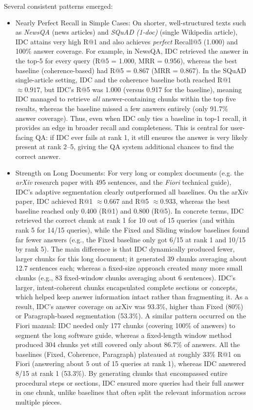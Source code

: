 \documentclass[12pt,a4paper]{report}
\begin{document}
Several consistent patterns emerged:

\begin{itemize}
\item Nearly Perfect Recall in Simple Cases: On shorter, well-structured texts such as \textit{NewsQA} (news articles) and \textit{SQuAD (1-doc)} (single Wikipedia article), IDC attains very high R@1 and also achieves \textit{perfect} Recall@5 (1.000) and 100\% answer coverage. For example, in NewsQA, IDC retrieved the answer in the top-5 for every query (R@5 = 1.000, MRR = 0.956), whereas the best baseline (coherence-based) had R@5 = 0.867 (MRR = 0.867). In the SQuAD single-article setting, IDC and the coherence baseline both reached R@1 $\approx 0.917$, but IDC's R@5 was 1.000 (versus 0.917 for the baseline), meaning IDC managed to retrieve \textit{all} answer-containing chunks within the top five results, whereas the baseline missed a few answers entirely (only 91.7\% answer coverage). Thus, even when IDC only ties a baseline in top-1 recall, it provides an edge in broader recall and completeness. This is central for user-facing QA: if IDC ever fails at rank 1, it still ensures the answer is very likely present at rank 2--5, giving the QA system additional chances to find the correct answer.

\item Strength on Long Documents: For very long or complex documents (e.g. the \textit{arXiv} research paper with 495 sentences, and the \textit{Fiori} technical guide), IDC's adaptive segmentation clearly outperformed all baselines. On the arXiv paper, IDC achieved R@1 $\approx 0.667$ and R@5 $\approx 0.933$, whereas the best baseline reached only 0.400 (R@1) and 0.800 (R@5). In concrete terms, IDC retrieved the correct chunk at rank 1 for 10 out of 15 queries (and within rank 5 for 14/15 queries), while the Fixed and Sliding window baselines found far fewer answers (e.g., the Fixed baseline only got 6/15 at rank 1 and 10/15 by rank 5). The main difference is that IDC dynamically produced fewer, larger chunks for this long document; it generated 39 chunks averaging about 12.7 sentences each; whereas a fixed-size approach created many more small chunks (e.g., 83 fixed-window chunks averaging about 6 sentences). IDC's larger, intent-coherent chunks encapsulated complete sections or concepts, which helped keep answer information intact rather than fragmenting it. As a result, IDC's answer coverage on arXiv was 93.3\%, higher than Fixed (80\%) or Paragraph-based segmentation (53.3\%). A similar pattern occurred on the Fiori manual: IDC needed only 177 chunks (covering 100\% of answers) to segment the long software guide, whereas a fixed-length window method produced 304 chunks yet still covered only about 86.7\% of answers. All the baselines (Fixed, Coherence, Paragraph) plateaued at roughly 33\% R@1 on Fiori (answering about 5 out of 15 queries at rank 1), whereas IDC answered 8/15 at rank 1 (53.3\%). By generating chunks that encompassed entire procedural steps or sections, IDC ensured more queries had their full answer in one chunk, unlike baselines that often split the relevant information across multiple pieces.


\end{itemize}
\end{document}
